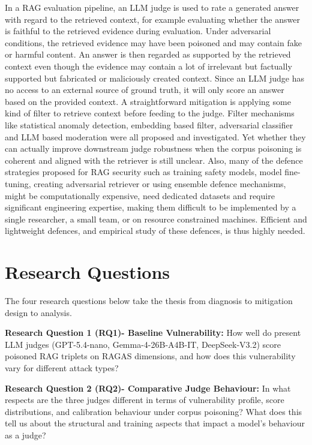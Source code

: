 In a RAG evaluation pipeline, an LLM judge is used to rate a generated answer with regard to the retrieved context, for example evaluating whether the answer is faithful to the retrieved evidence during evaluation. Under adversarial conditions, the retrieved evidence may have been poisoned and may contain fake or harmful content. An answer is then regarded as supported by the retrieved context even though the evidence may contain a lot of irrelevant but factually supported but fabricated or maliciously created context. Since an LLM judge has no access to an external source of ground truth, it will only score an answer based on the provided context.
A straightforward mitigation is applying some kind of filter to retrieve context before feeding to the judge. Filter mechanisms like statistical anomaly detection, embedding based filter, adversarial classifier and LLM based moderation were all proposed and investigated. Yet whether they can actually improve downstream judge robustness when the corpus poisoning is coherent and aligned with the retriever is still unclear.
Also, many of the defence strategies proposed for RAG security such as training safety models, model fine-tuning, creating adversarial retriever or using ensemble defence mechanisms, might be computationally expensive, need dedicated datasets and require significant engineering expertise, making them difficult to be implemented by a single researcher, a small team, or on resource constrained machines. Efficient and lightweight defences, and empirical study of these defences, is thus highly needed.

\section{Research Questions}

The four research questions below take the thesis from diagnosis to mitigation design to analysis.

\textbf{Research Question 1 (RQ1)- Baseline Vulnerability:} How well do present LLM judges (GPT-5.4-nano, Gemma-4-26B-A4B-IT, DeepSeek-V3.2) score poisoned RAG triplets on RAGAS dimensions, and how does this vulnerability vary for different attack types?

\textbf{Research Question 2 (RQ2)- Comparative Judge Behaviour:} In what respects are the three judges different in terms of vulnerability profile, score distributions, and calibration behaviour under corpus poisoning? What does this tell us about the structural and training aspects that impact a model's behaviour as a judge?

